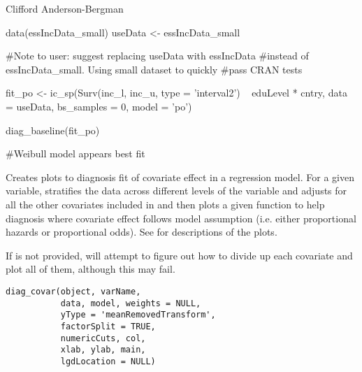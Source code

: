 \documentclass[a4paper]{book}
\begin{document}
%
\begin{Author}\relax
Clifford Anderson-Bergman
\end{Author}
%
\begin{Examples}
\begin{ExampleCode}
	 data(essIncData_small)
	 useData <- essIncData_small
	 
	 #Note to user: suggest replacing useData with essIncData
	 #instead of essIncData_small. Using small dataset to quickly 
	 #pass CRAN tests
	 
	 fit_po <- ic_sp(Surv(inc_l, inc_u, type = 'interval2') ~ eduLevel * cntry,
	                 data = useData, bs_samples = 0, model = 'po')
	
	 diag_baseline(fit_po)

	 #Weibull model appears best fit
\end{ExampleCode}
\end{Examples}
%
\begin{Description}\relax
Creates plots to diagnosis fit of covariate effect in a regression model. For a given variable, stratifies the data across different levels of the variable and adjusts for all the other covariates included in  and then plots a given function to help diagnosis where covariate effect follows model assumption (i.e. either proportional hazards or proportional odds). See  for descriptions of the plots. 

If  is not provided, will attempt to figure out how to divide up each covariate and plot all of them, although this may fail. 

\end{Description}
%
\begin{Usage}
\begin{verbatim}
diag_covar(object, varName, 
           data, model, weights = NULL,
           yType = 'meanRemovedTransform',
           factorSplit = TRUE, 
           numericCuts, col, 
           xlab, ylab, main, 
           lgdLocation = NULL) 
\end{verbatim}
\end{Usage}
%
\end{document}
